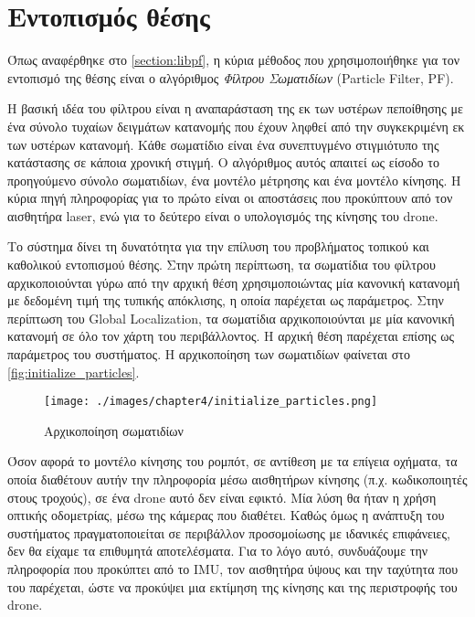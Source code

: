 \section{Εντοπισμός θέσης}
\label{section:localization_impl}

Όπως αναφέρθηκε στο \autoref{section:libpf}, η κύρια μέθοδος που χρησιμοποιήθηκε για τον εντοπισμό της θέσης είναι ο αλγόριθμος \emph{Φίλτρου Σωματιδίων} (Particle Filter, PF). 

Η βασική ιδέα του φίλτρου είναι η αναπαράσταση της εκ των υστέρων πεποίθησης με ένα σύνολο τυχαίων δειγμάτων κατανομής που έχουν ληφθεί από την συγκεκριμένη εκ των υστέρων κατανομή. Κάθε σωματίδιο είναι ένα συνεπτυγμένο στιγμιότυπο της κατάστασης σε κάποια χρονική στιγμή. Ο αλγόριθμος αυτός απαιτεί ως είσοδο το προηγούμενο σύνολο σωματιδίων, ένα μοντέλο μέτρησης και ένα μοντέλο κίνησης. Η κύρια πηγή πληροφορίας για το πρώτο είναι οι αποστάσεις που προκύπτουν από τον αισθητήρα laser, ενώ για το δεύτερο είναι ο υπολογισμός της κίνησης του drone.

Το σύστημα δίνει τη δυνατότητα για την επίλυση του προβλήματος τοπικού και καθολικού εντοπισμού θέσης. Στην πρώτη περίπτωση, τα σωματίδια του φίλτρου αρχικοποιούνται γύρω από την αρχική θέση χρησιμοποιώντας μία κανονική κατανομή με δεδομένη τιμή της τυπικής απόκλισης, η οποία παρέχεται ως παράμετρος. Στην περίπτωση του Global Localization, τα σωματίδια αρχικοποιούνται με μία κανονική κατανομή σε όλο τον χάρτη του περιβάλλοντος. Η αρχική θέση παρέχεται επίσης ως παράμετρος του συστήματος. Η αρχικοποίηση των σωματιδίων φαίνεται στο \autoref{fig:initialize_particles}.

\begin{figure}[!ht]
    \centering
    \texttt{[image: ./images/chapter4/initialize\_particles.png]}
    \caption{Αρχικοποίηση σωματιδίων}
    \label{fig:initialize_particles}
\end{figure} 

Όσον αφορά το μοντέλο κίνησης του ρομπότ, σε αντίθεση με τα επίγεια οχήματα, τα οποία διαθέτουν αυτήν την πληροφορία μέσω αισθητήρων κίνησης (π.χ. κωδικοποιητές στους τροχούς), σε ένα drone αυτό δεν είναι εφικτό. Μία λύση θα ήταν η χρήση οπτικής οδομετρίας, μέσω της κάμερας που διαθέτει. Καθώς όμως η ανάπτυξη του συστήματος πραγματοποιείται σε περιβάλλον προσομοίωσης με ιδανικές επιφάνειες, δεν θα είχαμε τα επιθυμητά αποτελέσματα. Για το λόγο αυτό, συνδυάζουμε την πληροφορία που προκύπτει από το IMU, τον αισθητήρα ύψους και την ταχύτητα που του παρέχεται, ώστε να προκύψει μια εκτίμηση της κίνησης και της περιστροφής του drone. 

